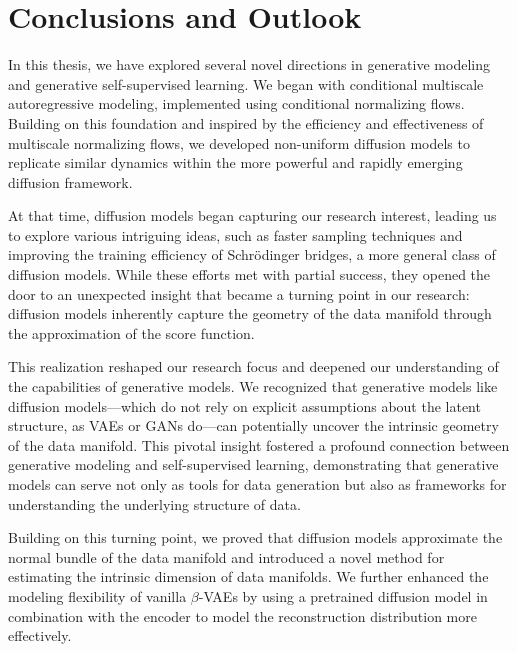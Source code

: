 
\chapter{Conclusions and Outlook}

In this thesis, we have explored several novel directions in generative modeling and generative self-supervised learning. We began with conditional multiscale autoregressive modeling, implemented using conditional normalizing flows. Building on this foundation and inspired by the efficiency and effectiveness of multiscale normalizing flows, we developed non-uniform diffusion models to replicate similar dynamics within the more powerful and rapidly emerging diffusion framework.

At that time, diffusion models began capturing our research interest, leading us to explore various intriguing ideas, such as faster sampling techniques and improving the training efficiency of Schrödinger bridges, a more general class of diffusion models. While these efforts met with partial success, they opened the door to an unexpected insight that became a turning point in our research: diffusion models inherently capture the geometry of the data manifold through the approximation of the score function. 

This realization reshaped our research focus and deepened our understanding of the capabilities of generative models. We recognized that generative models like diffusion models—which do not rely on explicit assumptions about the latent structure, as VAEs or GANs do—can potentially uncover the intrinsic geometry of the data manifold. This pivotal insight fostered a profound connection between generative modeling and self-supervised learning, demonstrating that generative models can serve not only as tools for data generation but also as frameworks for understanding the underlying structure of data.

Building on this turning point, we proved that diffusion models approximate the normal bundle of the data manifold and introduced a novel method for estimating the intrinsic dimension of data manifolds. We further enhanced the modeling flexibility of vanilla $\beta$-VAEs by using a pretrained diffusion model in combination with the encoder to model the reconstruction distribution more effectively.


